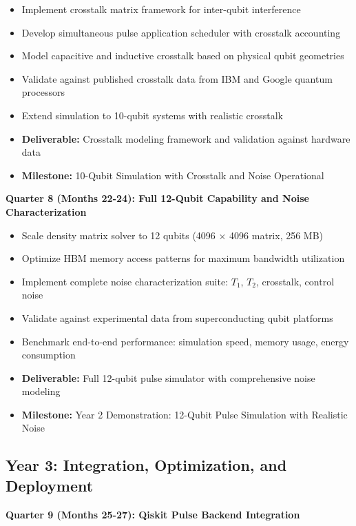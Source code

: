 \documentclass[12pt,a4paper]{article}
\begin{document}
\begin{itemize}[noitemsep]
\item Implement crosstalk matrix framework for inter-qubit interference
\item Develop simultaneous pulse application scheduler with crosstalk accounting
\item Model capacitive and inductive crosstalk based on physical qubit geometries
\item Validate against published crosstalk data from IBM and Google quantum processors
\item Extend simulation to 10-qubit systems with realistic crosstalk
\item \textbf{Deliverable:} Crosstalk modeling framework and validation against hardware data
\item \textbf{Milestone:} 10-Qubit Simulation with Crosstalk and Noise Operational
\end{itemize}

\textbf{Quarter 8 (Months 22-24): Full 12-Qubit Capability and Noise Characterization}

\begin{itemize}[noitemsep]
\item Scale density matrix solver to 12 qubits (4096 $\times$ 4096 matrix, 256 MB)
\item Optimize HBM memory access patterns for maximum bandwidth utilization
\item Implement complete noise characterization suite: $T_1$, $T_2$, crosstalk, control noise
\item Validate against experimental data from superconducting qubit platforms
\item Benchmark end-to-end performance: simulation speed, memory usage, energy consumption
\item \textbf{Deliverable:} Full 12-qubit pulse simulator with comprehensive noise modeling
\item \textbf{Milestone:} Year 2 Demonstration: 12-Qubit Pulse Simulation with Realistic Noise
\end{itemize}

\subsection{Year 3: Integration, Optimization, and Deployment}

\textbf{Quarter 9 (Months 25-27): Qiskit Pulse Backend Integration}
\end{document}
